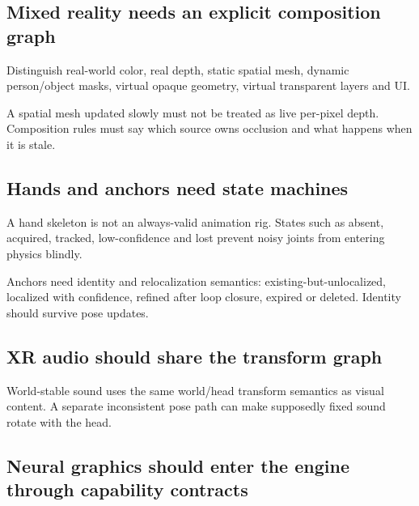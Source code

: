 \subsection{Mixed reality needs an explicit composition graph}\label{06-engine-ii-ch042-mixed-reality-needs-an-explicit-composition-graph}

\hypertarget{06-engine-ii-ch042-mixed-reality-needs-an-explicit-composition-graph}{}

Distinguish real-world color, real depth, static spatial mesh, dynamic person/object masks, virtual opaque geometry, virtual transparent layers and UI.

A spatial mesh updated slowly must not be treated as live per-pixel depth. Composition rules must say which source owns occlusion and what happens when it is stale.

\subsection{Hands and anchors need state machines}\label{06-engine-ii-ch042-hands-and-anchors-need-state-machines}

\hypertarget{06-engine-ii-ch042-hands-and-anchors-need-state-machines}{}

A hand skeleton is not an always-valid animation rig. States such as absent, acquired, tracked, low-confidence and lost prevent noisy joints from entering physics blindly.

Anchors need identity and relocalization semantics: existing-but-unlocalized, localized with confidence, refined after loop closure, expired or deleted. Identity should survive pose updates.

\subsection{XR audio should share the transform graph}\label{06-engine-ii-ch042-xr-audio-should-share-the-transform-graph}

\hypertarget{06-engine-ii-ch042-xr-audio-should-share-the-transform-graph}{}

World-stable sound uses the same world/head transform semantics as visual content. A separate inconsistent pose path can make supposedly fixed sound rotate with the head.

\subsection{Neural graphics should enter the engine through capability contracts}\label{06-engine-ii-ch042-neural-graphics-should-enter-the-engine-through-capability-contracts}

